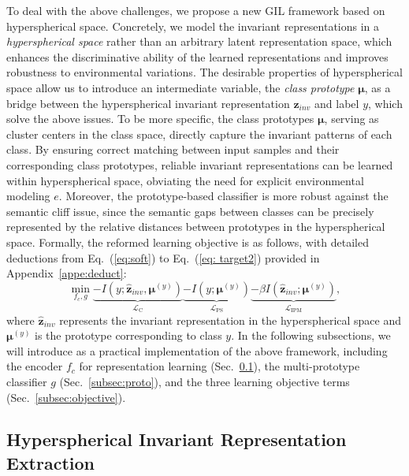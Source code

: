 To deal with the above challenges, we propose a new GIL framework based on hyperspherical space. Concretely, we model the invariant representations in a \textit{hyperspherical space} rather than an arbitrary latent representation space, which enhances the discriminative ability of the learned representations and improves robustness to environmental variations. The desirable properties of hyperspherical space allow us to introduce an intermediate variable, the \textit{class prototype} $\boldsymbol{\mu}$, as a bridge between the hyperspherical invariant representation $\mathbf{z}_{inv}$ and label $y$, which solve the above issues. To be more specific, the class prototypes $\boldsymbol{\mu}$, serving as cluster centers in the class space, directly capture the invariant patterns of each class. By ensuring correct matching between input samples and their corresponding class prototypes, reliable invariant representations can be learned within hyperspherical space, obviating the need for explicit environmental modeling 
$e$. Moreover, the prototype-based classifier is more robust against the semantic cliff issue, since the semantic gaps between classes can be precisely represented by the relative distances between prototypes in the hyperspherical space. Formally, the reformed learning objective is as follows, with detailed deductions from Eq.~(\ref{eq:soft}) to Eq.~(\ref{eq: target2}) provided in Appendix~\ref{appe:deduct}:
\begin{equation}\label{eq: target2}
   \underset{f_{c}, g}{\min} \underbrace{-I(y;\hat{\mathbf{z}}_{inv},\boldsymbol{\mu}^{(y)}) }_{\mathcal{L}_{\mathrm{C}}}\underbrace{-I(y ; \boldsymbol{\mu}^{(y)}) }_{\mathcal{L}_{\mathrm{PS}}}\underbrace{-\beta I(\hat{\mathbf{z}}_{inv};\boldsymbol{\mu}^{(y)})}_{\mathcal{L}_{\mathrm{IPM}}},
\end{equation}
where $\hat{\mathbf{z}}_{inv}$ represents the invariant representation in the hyperspherical space and $\boldsymbol{\mu}^{(y)}$ is the prototype corresponding to class $y$. In the following subsections, we will introduce \ourmethod as a practical implementation of the above framework, including the encoder $f_c$ for representation learning (Sec.~\ref{subsec:invariant_model}), the multi-prototype classifier $g$ (Sec.~\ref{subsec:proto}), and the three learning objective terms (Sec.~\ref{subsec:objective}).

\subsection{Hyperspherical Invariant Representation Extraction} \label{subsec:invariant_model}

